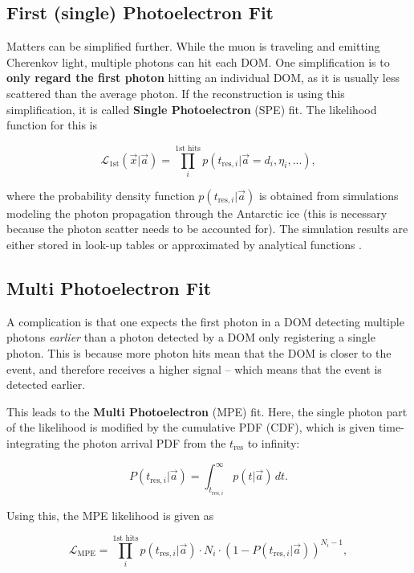 \subsection{First (single) Photoelectron Fit}
Matters can be simplified further. While the muon is traveling and emitting Cherenkov light, multiple photons can hit each DOM. One simplification is to \textbf{only regard the first photon} hitting an individual DOM, as it is usually less scattered than the average photon. If the reconstruction is using this simplification, it is called \textbf{Single Photoelectron} (SPE) fit. The likelihood function for this is

\begin{equation}
\mathcal{L}_\text{1st}(\vec{x}|\vec{a}) = \prod_i^\text{1st hits} p(t_{\text{res},i}|\vec{a}=d_i, \eta_i,...),
\end{equation}

where the probability density function $p(t_{\text{res},i}|\vec{a})$ is obtained from simulations modeling the photon propagation through the Antarctic ice (this is necessary because the photon scatter needs to be accounted for). The simulation results are either stored in look-up tables or approximated by analytical functions \cite{Ahrens2004}. 

\subsection{Multi Photoelectron Fit}
A complication is that one expects the first photon in a DOM detecting multiple photons \textit{earlier} than a photon detected by a DOM only registering a single photon. This is because more photon hits mean that the DOM is closer to the event, and therefore receives a higher signal -- which means that the event is detected earlier. 

This leads to the \textbf{Multi Photoelectron} (MPE) fit. Here, the single photon part of the likelihood is modified by the cumulative PDF (CDF), which is given time-integrating the photon arrival PDF from the $t_\text{res}$ to infinity:

\begin{equation}
P(t_{\text{res},i}|\vec{a}) = \int^{\infty}_{t_{\text{res},i}}p(t|\vec{a})\,dt.
\end{equation}

Using this, the MPE likelihood is given as

\begin{equation}
\mathcal{L}_\text{MPE} = \prod_i^\text{1st hits} p(t_{\text{res},i}|\vec{a}) \cdot N_i \cdot (1-P(t_{\text{res},i}|\vec{a}))^{N_i-1},
\end{equation}

